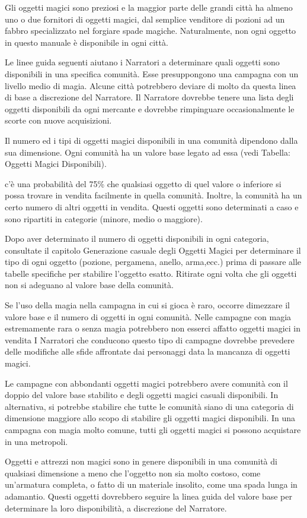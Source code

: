 \begin{multicols}{2}

\bigskip

Gli oggetti magici sono preziosi e la maggior parte delle grandi città ha almeno uno o due fornitori di oggetti magici, dal semplice venditore di pozioni ad un fabbro specializzato nel forgiare spade magiche. Naturalmente, non ogni oggetto in questo manuale è disponibile in ogni città.

Le linee guida seguenti aiutano i Narratori a determinare quali oggetti sono disponibili in una specifica comunità. Esse presuppongono una campagna con un livello medio di magia. Alcune città potrebbero deviare di molto da questa linea di base a discrezione del Narratore. Il Narratore dovrebbe tenere una lista degli oggetti disponibili da ogni mercante e dovrebbe rimpinguare occasionalmente le scorte con nuove acquisizioni.

Il numero ed i tipi di oggetti magici disponibili in una comunità dipendono dalla sua dimensione. Ogni comunità ha un valore base legato ad essa (vedi Tabella: Oggetti Magici Disponibili).

c'è una probabilità del 75\% che qualsiasi oggetto di quel valore o inferiore si possa trovare in vendita facilmente in quella comunità. Inoltre, la comunità ha un certo numero di altri oggetti in vendita. Questi oggetti sono determinati a caso e sono ripartiti in categorie (minore, medio o maggiore).

Dopo aver determinato il numero di oggetti disponibili in ogni categoria, consultate il capitolo Generazione casuale degli Oggetti Magici per determinare il tipo di ogni oggetto (pozione, pergamena, anello, arma,ecc.) prima di passare alle tabelle specifiche per stabilire l'oggetto esatto. Ritirate ogni volta che gli oggetti non si adeguano al valore base della comunità.

Se l'uso della magia nella campagna in cui si gioca è raro, occorre dimezzare il valore base e il numero di oggetti in ogni comunità. Nelle campagne con magia estremamente rara o senza magia potrebbero non esserci affatto oggetti magici in vendita I Narratori che conducono questo tipo di campagne dovrebbe prevedere delle modifiche alle sfide affrontate dai personaggi data la mancanza di oggetti magici.

Le campagne con abbondanti oggetti magici potrebbero avere comunità con il doppio del valore base stabilito e degli oggetti magici casuali disponibili. In alternativa, si potrebbe stabilire che tutte le comunità siano di una categoria di dimensione maggiore allo scopo di stabilire gli oggetti magici disponibili. In una campagna con magia molto comune, tutti gli oggetti magici si possono acquistare in una metropoli.

Oggetti e attrezzi non magici sono in genere disponibili in una comunità di qualsiasi dimensione a meno che l'oggetto non sia molto costoso, come un'armatura completa, o fatto di un materiale insolito, come una spada lunga in adamantio. Questi oggetti dovrebbero seguire la linea guida del valore base per determinare la loro disponibilità, a discrezione del Narratore.

\end{multicols}

